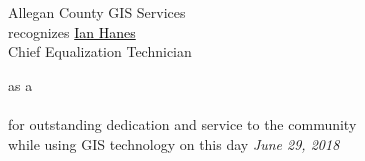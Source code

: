 \documentclass[landscape]{article}
\begin{document}
\textcolor{red!10!black!90}
{\small Allegan County GIS Services}\\
\textcolor{green!10!black!90}{
\tiny recognizes}
\uline{\textcolor{black}
{Ian Hanes}}
\\
\smallskip
\tiny Chief Equalization Technician
\smallskip

\textcolor{green!10!black!90}
{
\tiny as a
}
\smallskip
\tiny
\\
\\
\vspace{1mm}
\textcolor{green!10!black!90}
{
\tiny for outstanding dedication and service to the community
\\while using GIS technology on this day
\itshape June 29, 2018
}
\end{document}
